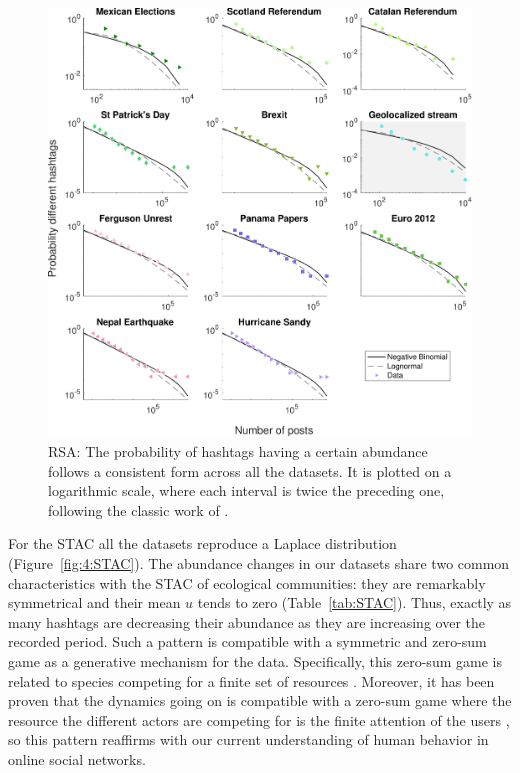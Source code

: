 \begin{figure}[h!]
    \centering
    \includegraphics[width=\textwidth]{figures/chp4/RSA_tweet_RemSam.pdf}
    \caption[RSA]{RSA: The probability of hashtags having a certain abundance follows a consistent form across all the datasets. It is plotted on a logarithmic scale, where each interval is twice the preceding one, following the classic work of \cite{preston1948commonness}. }
    \label{fig:4:RSA}
\end{figure}

For the STAC all the datasets reproduce a Laplace distribution (Figure~\ref{fig:4:STAC}). The abundance changes in our datasets share two common characteristics with the STAC of ecological communities: they are remarkably symmetrical and their mean $u$ tends to zero (Table~\ref{tab:STAC}). Thus, exactly as many hashtags are decreasing their abundance as they are increasing over the  recorded period. Such a pattern is compatible with a symmetric and zero-sum game as a generative mechanism for the data. Specifically, this zero-sum game is related to species competing for a finite set of resources \cite{marquet2005scaling,ji2020macroecological}. Moreover, it has been proven that the dynamics going on is compatible with a zero-sum game where the resource the different actors are competing for is the finite attention of the users \cite{gleeson2014competition,plata2021neutral,palazzi2021ecological,calleja2021quantifying}, so this pattern reaffirms with our current understanding of human behavior in online social networks.\\

